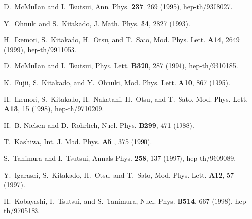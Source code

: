 \documentclass[12pt,a4paper]{article}
\begin{document}
\begin{thebibliography}{99}
  D.~McMullan and I.~Tsutsui, \newblock Ann. Phys. 
\textbf{237}, 269 (1995), hep-th/9308027.

  Y.~Ohnuki and S.~Kitakado, \newblock J. Math. Phys. 
\textbf{34}, 2827 (1993).

  H.~Ikemori, S.~Kitakado, H.~Otsu, and T.~Sato, %
\newblock Mod. Phys. Lett. \textbf{A14}, 2649 (1999), hep-th/9911053.

  D.~McMullan and I.~Tsutsui, \newblock Phys. Lett. 
\textbf{B320}, 287 (1994), hep-th/9310185.

  K.~Fujii, S.~Kitakado, and Y.~Ohnuki, \newblock Mod.
Phys. Lett. \textbf{A10}, 867 (1995).

  H.~Ikemori, S.~Kitakado, H.~Nakatani, H.~Otsu, and
T.~Sato, \newblock Mod. Phys. Lett. \textbf{A13}, 15 (1998), hep-th/9710209.

  H.~B. Nielsen and D.~Rohrlich, \newblock Nucl.
Phys. \textbf{B299}, 471 (1988).

  T.~Kashiwa, \newblock Int. J. Mod. Phys. \textbf{A5%
}, 375 (1990).

  S.~Tanimura and I.~Tsutsui, \newblock Annals
Phys. \textbf{258}, 137 (1997), hep-th/9609089.

  Y.~Igarashi, S.~Kitakado, H.~Otsu, and T.~Sato, %
\newblock Mod. Phys. Lett. \textbf{A12}, 57 (1997).

  H.~Kobayashi, I.~Tsutsui, and S.~Tanimura, %
\newblock Nucl. Phys. \textbf{B514}, 667 (1998), hep-th/9705183.
\end{thebibliography}
\end{document}
